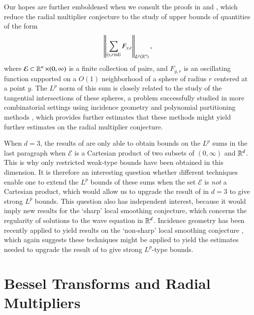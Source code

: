 Our hopes are further emboldened when we consult the proofs in \cite{HeoandNazarovandSeeger} and \cite{Cladek}, which reduce the radial multiplier conjecture to the study of upper bounds of quantities of the form
%
\[ \left\| \sum_{(y,r) \in \mathcal{E}} F_{y,r} \right\|_{L^p(\operatorname{\mathbb{R}}^n)}, \]
%
where $\mathcal{E} \subset \operatorname{\mathbb{R}}^n \times (0,\infty)$ is a finite collection of pairs, and $F_{y,r}$ is an oscillating function supported on a $O(1)$ neighborhood of a sphere of radius $r$ centered at a point $y$. The $L^p$ norm of this sum is closely related to the study of the tangential intersections of these spheres, a problem successfully studied in more combinatorial settings using incidence geometry and polynomial partitioning methods \cite{Zahl}, which provides further estimates that these methods might yield further estimates on the radial multiplier conjecture.

When $d = 3$, the results of \cite{Cladek} are only able to obtain bounds on the $L^p$ sums in the last paragraph when $\mathcal{E}$ is a Cartesian product of two subsets of $(0,\infty)$ and $\operatorname{\mathbb{R}}^d$. This is why only restricted weak-type bounds have been obtained in this dimension. It is therefore an interesting question whether different techniques enable one to extend the $L^p$ bounds of these sums when the set $\mathcal{E}$ is \emph{not} a Cartesian product, which would allow us to upgrade the result of \cite{Cladek} in $d = 3$ to give strong $L^p$ bounds. This question also has independent interest, because it would imply new results for the `sharp' local smoothing conjecture, which concerns the regularity of solutions to the wave equation in $\operatorname{\mathbb{R}}^d$. Incidence geometry has been recently applied to yield results on the `non-sharp' local smoothing conjecture \cite{GuthandWangandZhang}, which again suggests these techniques might be applied to yield the estimates needed to upgrade the result of \cite{Cladek} to give strong $L^p$-type bounds.

\section{Bessel Transforms and Radial Multipliers}

